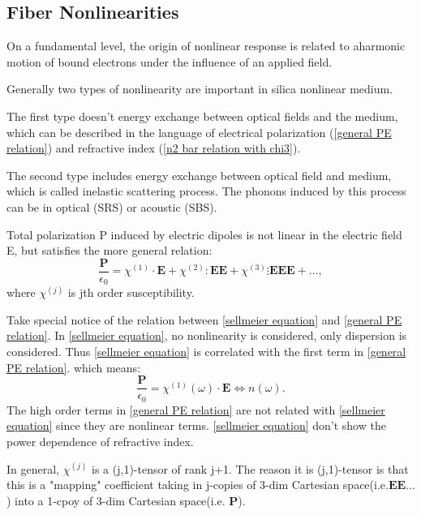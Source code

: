 \documentclass[12pt]{extarticle}
\numberwithin{equation}{section}
\numberwithin{figure}{section}
\numberwithin{table}{section}
\newcommand{\<}{\langle}
\renewcommand{\>}{\rangle}
\theoremstyle{definition}
\newcommand{\SubItem}[1]{
    {\setlength\itemindent{15pt} \item[-] #1}
}
\begin{document}
    \subsection{Fiber Nonlinearities}
        \begin{itemize}
            \item On a fundamental level, the origin of nonlinear response is related to aharmonic motion of bound electrons under the influence of an applied field.
            \item Generally two types of nonlinearity are important in silica nonlinear medium. 
                \SubItem{The first type doesn't energy exchange between optical fields and the medium, which can be described in the language of electrical polarization (\autoref{general PE relation}) and refractive index (\autoref{n2 bar relation with chi3}).}
                \SubItem{The second type includes energy exchange between optical field and medium, which is called inelastic scattering process. The phonons induced by this process can be in optical (SRS) or acoustic (SBS).}
            \item Total polarization P induced by electric dipoles is not linear in the electric field E, but satisfies the more general relation:
                \begin{equation}
                    \frac{\boldsymbol{P}}{\epsilon_0} = \chi^{(1)} \cdot \boldsymbol{E} + \chi^{(2)} : \boldsymbol{EE} + \chi^{(3)} \vdots \boldsymbol{EEE} + \dots,
                    \label{general PE relation}
                \end{equation}
                where $\chi^{(j)}$ is jth order susceptibility. 
                \SubItem{Take special notice of the relation between \autoref{sellmeier equation} and \autoref{general PE relation}. In \autoref{sellmeier equation}, no nonlinearity is considered, only dispersion is considered. Thus \autoref{sellmeier equation} is correlated with the first term in \autoref{general PE relation}. which means:
                    \begin{equation}
                        \frac{\boldsymbol{P}}{\epsilon_0} = \chi^{(1)}(\omega) \cdot \boldsymbol{E} \iff n(\omega).
                    \end{equation}
                    The high order terms in \autoref{general PE relation} are not related with \autoref{sellmeier equation} since they are nonlinear terms. \autoref{sellmeier equation} don't show the power dependence of refractive index.
                }
                \SubItem{In general, $\chi^{(j)}$ is a (j,1)-tensor\cite{noauthor_tensor_2019} of rank j+1. The reason it is (j,1)-tensor is that this is a "mapping" coefficient taking in j-copies of 3-dim Cartesian space(i.e.$\boldsymbol{EE\dots}$) into a 1-cpoy of 3-dim Cartesian space(i.e. $\boldsymbol{P}$).}

\end{itemize}
\end{document}
